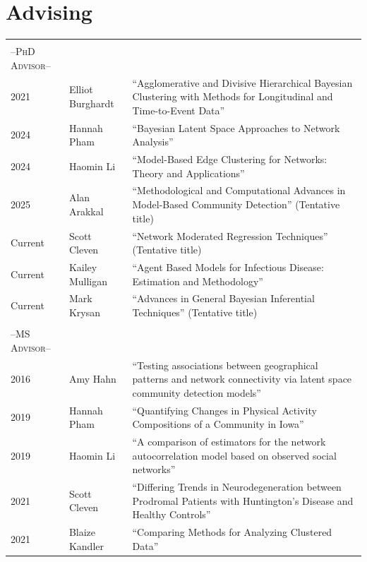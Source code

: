 \documentclass[11pt]{article}
\newcommand{\grayline}{\arrayrulecolor{gray!50} \hline \arrayrulecolor{black}}
\begin{document}
\vspace{1pc}
\section{Advising}

\begin{longtable}{p{}|p{}p{}} 
\multicolumn{3}{c}{} \\
\multicolumn{1}{l}{\large--\textsc{PhD Advisor}--\normalsize} &   & \\
\grayline
2021 & Elliot Burghardt & ``Agglomerative and Divisive Hierarchical Bayesian Clustering with Methods for Longitudinal and Time-to-Event Data'' \\
2024  & Hannah Pham & ``Bayesian Latent Space Approaches to Network Analysis'' \\
2024 & Haomin Li & ``Model-Based Edge Clustering for Networks:  Theory and Applications'' \\
2025 & Alan Arakkal & ``Methodological and Computational Advances in Model-Based Community Detection'' (Tentative title) \\
Current & Scott Cleven & ``Network Moderated Regression Techniques'' (Tentative title) \\
Current & Kailey Mulligan & ``Agent Based Models for Infectious Disease: Estimation and Methodology'' \\
Current & Mark Krysan & ``Advances in General Bayesian Inferential Techniques'' (Tentative title) \\
\multicolumn{3}{c}{} \\
\multicolumn{1}{l}{\large--\textsc{MS Advisor}--\normalsize} &   & \\
\grayline
2016 & Amy Hahn & ``Testing associations between geographical patterns and network connectivity via latent space community detection models''\\ 
2019 & Hannah Pham & ``Quantifying Changes in Physical Activity Compositions of a Community in Iowa'' \\
2019 & Haomin Li & ``A comparison of estimators for the network autocorrelation model based on observed social networks'' \\
2021 & Scott Cleven & ``Differing Trends in Neurodegeneration between Prodromal Patients with Huntington’s Disease and Healthy Controls'' \\
2021 & Blaize Kandler & ``Comparing Methods for Analyzing Clustered Data'' \\

\end{longtable}
\end{document}
